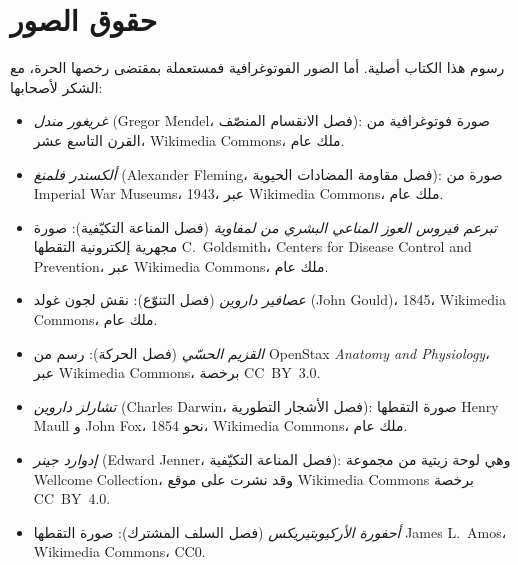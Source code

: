 \chapter*{حقوق الصور}

\begingroup\sloppy

رسوم هذا الكتاب أصلية. أما الصور الفوتوغرافية فمستعملة بمقتضى رخصها
الحرة، مع الشكر لأصحابها:

\begin{itemize}
  \item \emph{غريغور مندل} (Gregor Mendel، فصل الانقسام المنصّف): صورة
        فوتوغرافية من القرن التاسع عشر، Wikimedia Commons، ملك عام.
  \item \emph{ألكسندر فلمنغ} (Alexander Fleming، فصل مقاومة المضادات الحيوية): صورة
        من Imperial War Museums، 1943، عبر Wikimedia Commons،
        ملك عام.
  \item \emph{تبرعم فيروس العوز المناعي البشري من لمفاوية} (فصل
        المناعة التكيّفية): صورة مجهرية إلكترونية التقطها
        C.~Goldsmith، Centers for Disease Control and Prevention،
        عبر Wikimedia Commons، ملك عام.
  \item \emph{عصافير داروين} (فصل التنوّع): نقش لجون غولد (John Gould)، 1845،
        Wikimedia Commons، ملك عام.
  \item \emph{القزيم الحسّي} (فصل الحركة): رسم من
        OpenStax \emph{Anatomy and Physiology}، عبر Wikimedia
        Commons، برخصة CC~BY~3.0.
  \item \emph{تشارلز داروين} (Charles Darwin، فصل الأشجار التطورية): صورة التقطها
        Henry Maull و John Fox، نحو 1854، Wikimedia Commons،
        ملك عام.
  \item \emph{إدوارد جينر} (Edward Jenner، فصل المناعة التكيّفية): وهي لوحة
        زيتية من مجموعة Wellcome Collection، وقد نشرت
        على موقع Wikimedia Commons برخصة CC~BY~4.0.
  \item \emph{أحفورة الأركيوبتيريكس} (فصل السلف المشترك): صورة التقطها
        James L.~Amos، Wikimedia Commons، CC0.
\end{itemize}

